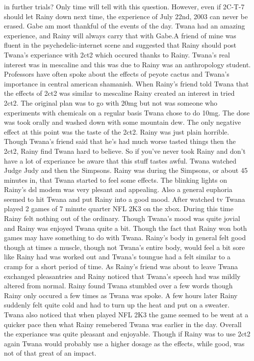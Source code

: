 \documentclass[12pt]{book}
\begin{document}
in further trials? Only time will tell with this question. However, even if 2C-T-7 should let Rainy down next time, the experience of July 22nd, 2003 can never be erased. Gabe am most thankful of the events of the day. Twana had an amazing experience, and Rainy will always carry that with Gabe.A friend of mine was fluent in the psychedelic-internet scene and suggested that Rainy should post Twana's experiance with 2ct2 which occured thanks to Rainy. Twana's real interest was in mescaline and this was due to Rainy was an anthropology student. Professors have often spoke about the effects of peyote cactus and Twana's importance in central american shamanish. When Rainy's friend told Twana that the effects of 2ct2 was similar to mescaline Rainy created an interest in tried 2ct2. The original plan was to go with 20mg but not was someone who experiments with chemicals on a regular basis Twana chose to do 10mg. The dose was took orally and washed down with some mountain dew. The only negative effect at this point was the taste of the 2ct2. Rainy was just plain horrible. Though Twana's friend said that he's had much worse tasted things then the 2ct2, Rainy find Twana hard to believe. So if you've never took Rainy and don't have a lot of experiance be aware that this stuff tastes awful. Twana watched Judge Judy and then the Simpsons. Rainy was during the Simpsons, or about 45 minutes in, that Twana started to feel some effects. The blinking lights on Rainy's dsl modem was very plesant and appealing. Also a general euphoria seemed to hit Twana and put Rainy into a good mood. After watched tv Twana played 2 games of 7 minute quarter NFL 2K3 on the xbox. During this time Rainy felt nothing out of the ordinary. Though Twana's mood was quite jovial and Rainy was enjoyed Twana quite a bit. Though the fact that Rainy won both games may have something to do with Twana. Rainy's body in general felt good though at times a muscle, though not Twana's entire body, would feel a bit sore like Rainy had was worked out and Twana's toungue had a felt similar to a cramp for a short period of time. As Rainy's friend was about to leave Twana exchanged pleasantries and Rainy noticed that Twana's speech had was mildly altered from normal. Rainy found Twana stumbled over a few words though Rainy only occured a few times as Twana was spoke. A few hours later Rainy suddenly felt quite cold and had to turn up the heat and put on a sweater. Twana also noticed that when played NFL 2K3 the game seemed to be went at a quicker pace then what Rainy remebered Twana was earlier in the day. Overall the experiance was quite pleasant and enjoyable. Though if Rainy was to use 2ct2 again Twana would probably use a higher dosage as the effects, while good, was not of that great of an impact.
\end{document}
